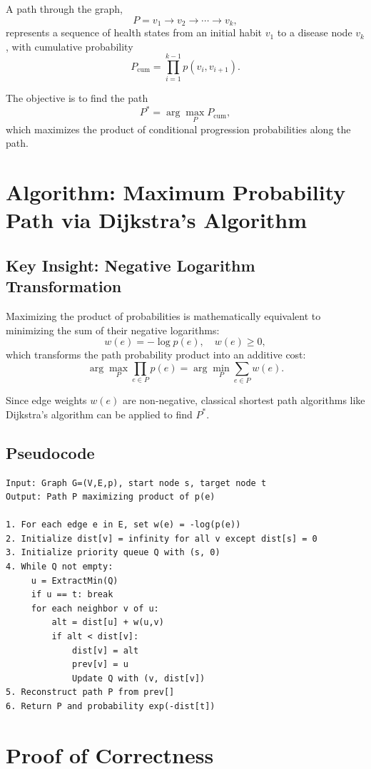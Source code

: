 \documentclass[11pt]{article}
\begin{document}
A path through the graph,
\[
P = v_1 \to v_2 \to \cdots \to v_k,
\]
represents a sequence of health states from an initial habit \(v_1\) to a disease node \(v_k\), with cumulative probability
\[
P_{\mathrm{cum}} = \prod_{i=1}^{k-1} p(v_i, v_{i+1}).
\]

The objective is to find the path
\[
P^* = \arg\max_{P} P_{\mathrm{cum}},
\]
which maximizes the product of conditional progression probabilities along the path.

\section{Algorithm: Maximum Probability Path via Dijkstra's Algorithm}

\subsection{Key Insight: Negative Logarithm Transformation}
Maximizing the product of probabilities is mathematically equivalent to minimizing the sum of their negative logarithms:
\[
w(e) = -\log p(e), \quad w(e) \geq 0,
\]
which transforms the path probability product into an additive cost:
\[
\arg\max_P \prod_{e \in P} p(e) = \arg\min_P \sum_{e \in P} w(e).
\]

Since edge weights \(w(e)\) are non-negative, classical shortest path algorithms like Dijkstra's algorithm can be applied to find \(P^*\).

\subsection{Pseudocode}

\begin{verbatim}
Input: Graph G=(V,E,p), start node s, target node t
Output: Path P maximizing product of p(e)

1. For each edge e in E, set w(e) = -log(p(e))
2. Initialize dist[v] = infinity for all v except dist[s] = 0
3. Initialize priority queue Q with (s, 0)
4. While Q not empty:
     u = ExtractMin(Q)
     if u == t: break
     for each neighbor v of u:
         alt = dist[u] + w(u,v)
         if alt < dist[v]:
             dist[v] = alt
             prev[v] = u
             Update Q with (v, dist[v])
5. Reconstruct path P from prev[]
6. Return P and probability exp(-dist[t])
\end{verbatim}

\section{Proof of Correctness}
\end{document}
